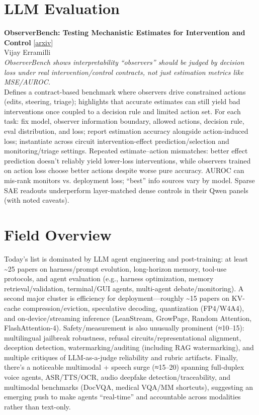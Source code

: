 \documentclass[12pt,letterpaper]{article}
\begin{document}
\medskip


\section*{LLM Evaluation}

{\small\textbf{ObserverBench: Testing Mechanistic Estimates for Intervention and Control}} {\scriptsize[\href{https://arxiv.org/abs/2609.03026}{arxiv}]}\\
{\scriptsize Vijay Erramilli}\\

{\small\textit{ObserverBench shows interpretability ``observers'' should be judged by decision loss under real intervention/control contracts, not just estimation metrics like MSE/AUROC.}}\\[1pt]
{\footnotesize Defines a contract-based benchmark where observers drive constrained actions (edits, steering, triage); highlights that accurate estimates can still yield bad interventions once coupled to a decision rule and limited action set. For each task: fix model, observer information boundary, allowed actions, decision rule, eval distribution, and loss; report estimation accuracy alongside action-induced loss; instantiate across circuit intervention-effect prediction/selection and monitoring/triage settings. Repeated estimate--action mismatches: better effect prediction doesn't reliably yield lower-loss interventions, while observers trained on action loss choose better actions despite worse pure accuracy. AUROC can mis-rank monitors vs. deployment loss; ``best'' info sources vary by model. Sparse SAE readouts underperform layer-matched dense controls in their Qwen panels (with noted caveats).}

\medskip



\section*{Field Overview}
{\footnotesize Today's list is dominated by LLM agent engineering and post-training: at least \textasciitilde{}25 papers on harness/prompt evolution, long-horizon memory, tool-use protocols, and agent evaluation (e.g., harness optimization, memory retrieval/validation, terminal/GUI agents, multi-agent debate/monitoring). A second major cluster is efficiency for deployment---roughly \textasciitilde{}15 papers on KV-cache compression/eviction, speculative decoding, quantization (FP4/W4A4), and on-device/streaming inference (LeanStream, GrowPage, Random Attention, FlashAttention-4). Safety/measurement is also unusually prominent (≈10--15): multilingual jailbreak robustness, refusal circuits/representational alignment, deception detection, watermarking/auditing (including RAG watermarking), and multiple critiques of LLM-as-a-judge reliability and rubric artifacts. Finally, there's a noticeable multimodal + speech surge (≈15--20) spanning full-duplex voice agents, ASR/TTS/OCR, audio deepfake detection/traceability, and multimodal benchmarks (DocVQA, medical VQA/MM shortcuts), suggesting an emerging push to make agents ``real-time'' and accountable across modalities rather than text-only.}
\end{document}
